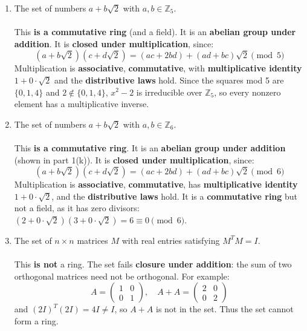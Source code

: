 \documentclass{article}
\newcommand{\Zn}[1]{\mathbb{Z}_{#1}}
\begin{document}
\begin{enumerate}
\begin{enumerate}
            \item The set of numbers $a + b\sqrt{2}$ with $a,b \in \Zn{5}$.
            \\
            \\ This \textbf{is a commutative ring} (and a field). It is an \textbf{abelian group under addition}. It is \textbf{closed under multiplication}, since:
            \[
                (a+b\sqrt{2})(c+d\sqrt{2}) = (ac+2bd) + (ad+bc)\sqrt{2} \pmod{5}
            \]
            Multiplication is \textbf{associative}, \textbf{commutative}, with \textbf{multiplicative identity} $1+0\cdot\sqrt{2}$ and the \textbf{distributive laws} hold. Since the squares mod 5 are $\{0,1,4\}$ and $2 \notin \{0,1,4\}$, $x^2-2$ is irreducible over $\Zn{5}$, so every nonzero element has a multiplicative inverse.
            \item The set of numbers $a + b\sqrt{2}$ with $a,b \in \Zn{6}$.
            \\
            \\ This \textbf{is a commutative ring}. It is an \textbf{abelian group under addition} (shown in part 1(k)). It is \textbf{closed under multiplication}, since:
            \[
                (a+b\sqrt{2})(c+d\sqrt{2}) = (ac+2bd) + (ad+bc)\sqrt{2} \pmod{6}
            \]
            Multiplication is \textbf{associative}, \textbf{commutative}, has \textbf{multiplicative identity} $1+0\cdot\sqrt{2}$, and the \textbf{distributive laws} hold. It is a \textbf{commutative ring} but not a field, as it has zero divisors: $(2+0\cdot\sqrt{2})(3+0\cdot\sqrt{2}) = 6 \equiv 0 \pmod{6}$.

            \item The set of $n \times n$ matrices $M$ with real entries satisfying $M^TM = I$.
            \\
            \\ This \textbf{is not} a ring. The set fails \textbf{closure under addition}: the sum of two orthogonal matrices need not be orthogonal. For example:
            \[
                A = \begin{pmatrix}1&0\\0&1\end{pmatrix}, \quad A + A = \begin{pmatrix}2&0\\0&2\end{pmatrix}
            \]
            and $(2I)^T(2I) = 4I \neq I$, so $A+A$ is not in the set. Thus the set cannot form a ring.


\end{enumerate}
\end{enumerate}
\end{document}
